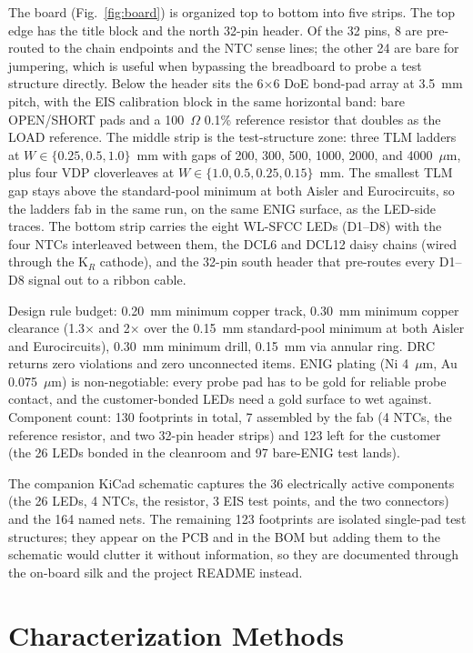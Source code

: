 \documentclass[conference]{IEEEtran}
\begin{document}
The board (Fig.~\ref{fig:board}) is organized top to bottom into five
strips. The top edge has the title block and the north 32-pin header. Of
the 32 pins, 8 are pre-routed to the chain endpoints and the NTC sense
lines; the other 24 are bare for jumpering, which is useful when bypassing
the breadboard to probe a test structure directly. Below the header sits
the 6$\times$6 DoE bond-pad array at 3.5~mm pitch, with the EIS
calibration block in the same horizontal band: bare OPEN/SHORT pads and a
100~$\Omega$ 0.1\% reference resistor that doubles as the LOAD reference.
The middle strip is the test-structure zone: three TLM ladders at
$W \in \{0.25, 0.5, 1.0\}$~mm with gaps of 200, 300, 500, 1000, 2000, and
4000~$\mu$m, plus four VDP cloverleaves at $W \in \{1.0, 0.5, 0.25, 0.15\}$~mm.
The smallest TLM gap stays above the standard-pool minimum at both Aisler
and Eurocircuits, so the ladders fab in the same run, on the same ENIG
surface, as the LED-side traces. The bottom strip carries the eight WL-SFCC LEDs (D1--D8) with the
four NTCs interleaved between them, the DCL6 and DCL12 daisy chains
(wired through the K$_R$ cathode), and the 32-pin south header that
pre-routes every D1--D8 signal out to a ribbon cable.

Design rule budget: 0.20~mm minimum copper track, 0.30~mm minimum copper
clearance (1.3$\times$ and 2$\times$ over the 0.15~mm standard-pool minimum
at both Aisler and Eurocircuits), 0.30~mm minimum drill, 0.15~mm via
annular ring. DRC returns zero violations and zero unconnected items. ENIG
plating (Ni 4~$\mu$m, Au 0.075~$\mu$m) is non-negotiable: every probe pad
has to be gold for reliable probe contact, and the customer-bonded LEDs
need a gold surface to wet against. Component count: 130 footprints in
total, 7 assembled by the fab (4 NTCs, the reference resistor, and two
32-pin header strips) and 123 left for the customer (the 26 LEDs bonded in
the cleanroom and 97 bare-ENIG test lands).

The companion KiCad schematic captures the 36 electrically active
components (the 26 LEDs, 4 NTCs, the resistor, 3 EIS test points, and the
two connectors) and the 164 named nets. The remaining 123 footprints are
isolated single-pad test structures; they appear on the PCB and in the BOM
but adding them to the schematic would clutter it without information, so
they are documented through the on-board silk and the project README
instead.

\section{Characterization Methods}
\end{document}
